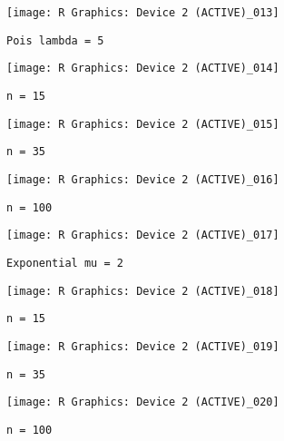 \documentclass[11pt,twocolumn]{article}
\begin{document}
\begin{figure}[h!]
\texttt{[image: R Graphics: Device 2 (ACTIVE)\_013]}
\centering
\caption{\texttt{Pois lambda = 5}}

\texttt{[image: R Graphics: Device 2 (ACTIVE)\_014]}
\centering
\caption{\texttt{n = 15}}

\texttt{[image: R Graphics: Device 2 (ACTIVE)\_015]}
\centering
\caption{\texttt{n = 35}}

\texttt{[image: R Graphics: Device 2 (ACTIVE)\_016]}
\centering
\caption{\texttt{n = 100}}
\end{figure}

\begin{figure}[h!]
\texttt{[image: R Graphics: Device 2 (ACTIVE)\_017]}
\centering
\caption{\texttt{Exponential mu = 2}}

\texttt{[image: R Graphics: Device 2 (ACTIVE)\_018]}
\centering
\caption{\texttt{n = 15}}

\texttt{[image: R Graphics: Device 2 (ACTIVE)\_019]}
\centering
\caption{\texttt{n = 35}}

\texttt{[image: R Graphics: Device 2 (ACTIVE)\_020]}
\centering
\caption{\texttt{n = 100}}
\end{figure}
\end{document}
